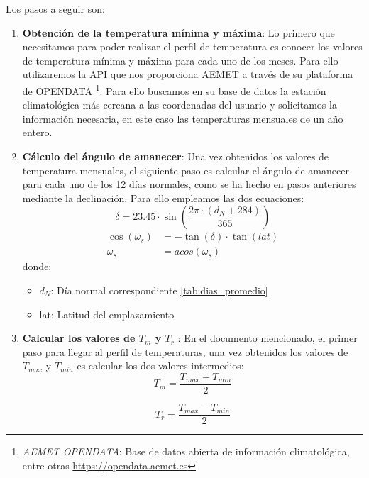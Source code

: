 Los pasos a seguir son:

\begin{enumerate}
\item \textbf{Obtención de la temperatura mínima y máxima}: Lo primero que necesitamos para poder realizar el perfil de temperatura es conocer los valores de temperatura mínima y máxima para cada uno de los meses. Para ello utilizaremos la API que nos proporciona AEMET a través de su plataforma de OPENDATA \footnote{\textit{AEMET OPENDATA}: Base de datos abierta de información climatológica, entre otras \url{https://opendata.aemet.es}}. Para ello buscamos en su base de datos la estación climatológica más cercana a las coordenadas del usuario y solicitamos la información necesaria, en este caso las temperaturas mensuales de un año entero.
\item \textbf{Cálculo del ángulo de amanecer}: Una vez obtenidos los valores de temperatura mensuales, el siguiente paso es calcular el ángulo de amanecer para cada uno de los 12 días normales, como se ha hecho en pasos anteriores mediante la declinación. Para ello empleamos las dos ecuaciones:
\begin{equation}
\delta = 23.45 \cdot \sin\left(\frac{2\pi \cdot (d_N + 284) }{365}\right)
\end{equation}
\begin{equation}
\begin{align}
\cos(\omega_s) &= -\tan(\delta) \cdot \tan(lat)\\
\omega_s &= acos(\omega_s)
\end{align}
\end{equation}
donde:
\begin{itemize}
\item $d_N$: Día normal correspondiente \ref{tab:dias_promedio}
\item lat: Latitud del emplazamiento
\end{itemize}
\item \textbf{Calcular los valores de $T_m$ y $T_r$ }: En el documento mencionado, el primer paso para llegar al perfil de temperaturas, una vez obtenidos los valores de $T_{max}$ y $T_{min}$ es calcular los dos valores intermedios:
\begin{equation}
T_m = \frac{T_{max} + T_{min} }{2}
\end{equation}

\begin{equation}
T_r = \frac{T_{max} - T_{min} }{2}
\end{equation}


\end{enumerate}
